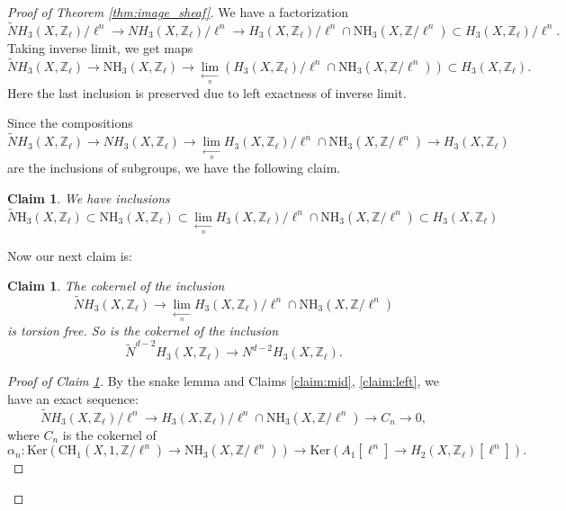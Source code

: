 \documentclass{amsart}
\newtheorem{claim}[theorem]{Claim}
\theoremstyle{definition}
\theoremstyle{remark}
\newcommand{\mbb}{\mathbb}
\newcommand{\ZZ}{\mbb{Z}}
\begin{document}
\begin{proof}[Proof of Theorem {\ref{thm:image_sheaf}}]
We have a factorization
\[
\tilde{N}H_3(X, \ZZ_\ell)/\ell^n \to {N}H_3(X, \ZZ_\ell)/\ell^n \to H_3(X, \ZZ_\ell)/\ell^n \cap \text{NH}_3(X, \ZZ/\ell^n) \subset H_3(X, \ZZ_\ell)/\ell^n.
\]
Taking inverse limit, we get maps
\begin{equation*}
    \tilde{N}H_3(X, \ZZ_\ell) \to \text{NH}_3(X, \ZZ_\ell) \to \lim \limits_{\xleftarrow[n]{}} (H_3(X, \ZZ_\ell)/\ell^n \cap \text{NH}_3(X, \ZZ/\ell^n)) \subset H_3(X, \ZZ_\ell).
\end{equation*}
Here the last inclusion is preserved due to left exactness of inverse limit.

Since the compositions
\[
\tilde{N}H_3(X, \ZZ_\ell) \to {N}H_3(X, \ZZ_\ell) \to \lim \limits_{\xleftarrow[n]{}} H_3(X, \ZZ_\ell)/\ell^n \cap \text{NH}_3(X, \ZZ/\ell^n) \to H_3(X, \ZZ_\ell)
\]
are the inclusions of subgroups, we have the following claim.
\begin{claim}\label{claim:inj}
    We have inclusions
    \[
\tilde{N}\text{H}_3(X, \ZZ_\ell) \subset \text{NH}_3(X, \ZZ_\ell) \subset \lim \limits_{\xleftarrow[n]{}} H_3(X, \ZZ_\ell)/\ell^n \cap \text{NH}_3(X, \ZZ/\ell^n) \subset H_3(X, \ZZ_\ell)
\]
\end{claim}


Now our next claim is:
\begin{claim}\label{claim:torfree}
    The cokernel of the inclusion
\begin{equation}\label{eq:torsionfree}
     \tilde{N}H_3(X, \ZZ_\ell) \to \lim \limits_{\xleftarrow[n]{}} H_3(X, \ZZ_\ell)/\ell^n \cap \text{NH}_3(X, \ZZ/\ell^n)
\end{equation}
is torsion free. 
So is the cokernel of the inclusion \[
\tilde{N}^{d-2}H_3(X, \ZZ_\ell)\to N^{d-2}H_3(X, \ZZ_\ell).\]
\end{claim}
\begin{proof}[Proof of Claim \ref{claim:torfree}]


By the snake lemma and Claims \ref{claim:mid}, \ref{claim:left}, we have an exact sequence:
\begin{equation}\label{eq:exact}
    \tilde{N}H_3(X, \ZZ_\ell)/\ell^n \to H_3(X, \ZZ_\ell)/\ell^n \cap \text{NH}_3(X, \ZZ/\ell^n) \to C_n \to 0,
\end{equation}
where 
$C_n$ is the cokernel of
\begin{equation}\label{eq:alpha}
    \alpha_n: \text{Ker}(\text{CH}_1(X, 1, \ZZ/\ell^n) \to \text{NH}_3(X, \ZZ/\ell^n)) \to \text{Ker}(A_1[\ell^n] \to H_2(X, \ZZ_\ell)[\ell^n]).
\end{equation}


\end{proof}
\end{proof}
\end{document}
